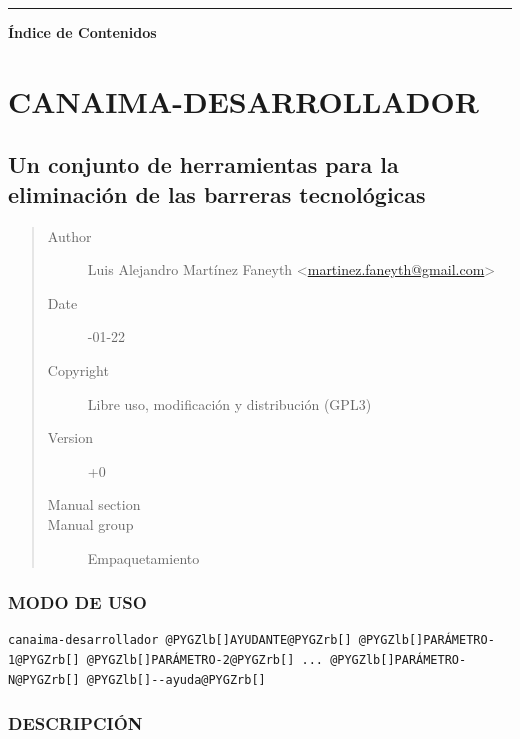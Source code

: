 \documentclass[letterpaper,12pt,spanish]{manual}
\begin{document}
\bigskip\hrule{}\bigskip


\textbf{Índice de Contenidos}

\resetcurrentobjects
\hypertarget{--doc-man-canaima-desarrollador}{}

\chapter{\textbf{CANAIMA-DESARROLLADOR}}


\section{Un conjunto de herramientas para la eliminación de las barreras tecnológicas}
\begin{quote}\begin{description}
\item[{Author}] \leavevmode
Luis Alejandro Martínez Faneyth \textless{}\href{mailto:martinez.faneyth@gmail.com}{martinez.faneyth@gmail.com}\textgreater{}

\item[{Date}] -01-22

\item[{Copyright}] \leavevmode
Libre uso, modificación y distribución (GPL3)

\item[{Version}] +0

\item[{Manual section}] 

\item[{Manual group}] \leavevmode
Empaquetamiento

\end{description}\end{quote}


\subsection{\textbf{MODO DE USO}}

\begin{Verbatim}[commandchars=@\[\]]
canaima-desarrollador @PYGZlb[]AYUDANTE@PYGZrb[] @PYGZlb[]PARÁMETRO-1@PYGZrb[] @PYGZlb[]PARÁMETRO-2@PYGZrb[] ... @PYGZlb[]PARÁMETRO-N@PYGZrb[] @PYGZlb[]--ayuda@PYGZrb[]
\end{Verbatim}


\subsection{\textbf{DESCRIPCIÓN}}
\end{document}
